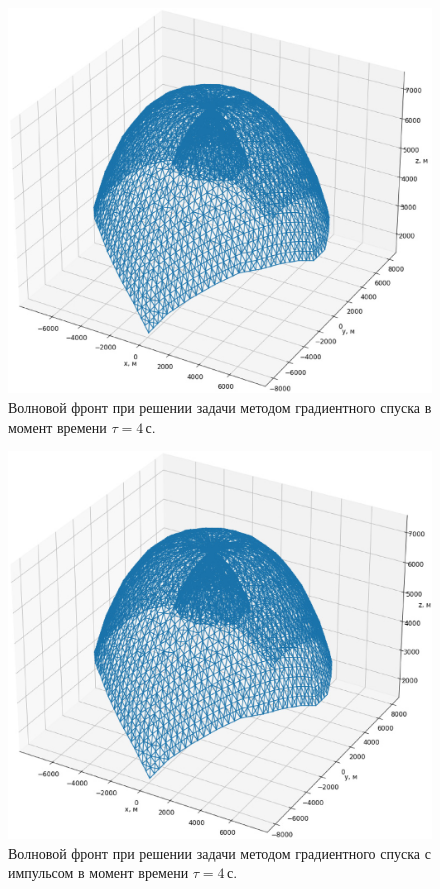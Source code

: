 \documentclass[12pt, cleqn, a4paper]{article}
\begin{document}
\begin{figure}[h] 
\centering
\includegraphics[width=1.0\linewidth]{grad_step.eps}
\caption{Волновой фронт при решении задачи методом градиентного спуска в момент времени $\tau = 4$\,с.}
\label{fig:grad_step}
\end{figure}

\begin{figure}[h] 
\centering
\includegraphics[width=1.0\linewidth]{grad_impulse.eps}
\caption{Волновой фронт при решении задачи методом градиентного спуска с импульсом в момент времени $\tau = 4$\,с.}
\label{fig:grad_impulse}
\end{figure}
\end{document}
